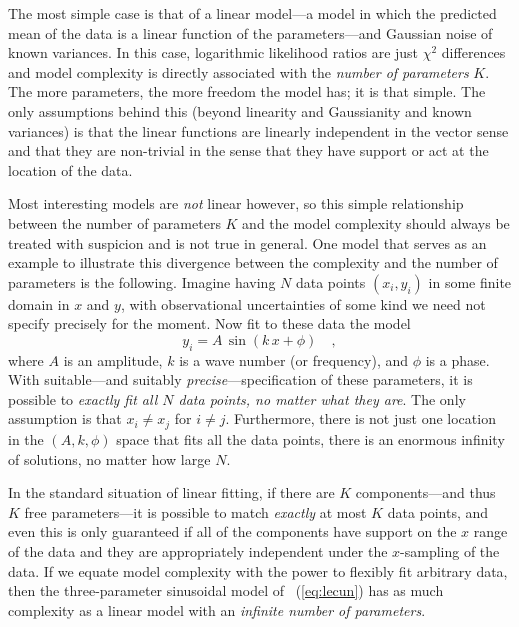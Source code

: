 \documentclass[12pt,twoside]{article}
\begin{document}
The most simple case is that of a linear model---a model in which the
predicted mean of the data is a linear function of the
parameters---and Gaussian noise of known variances.  In this case,
logarithmic likelihood ratios are just $\chi^2$ differences and model
complexity is directly associated with the \emph{number of parameters}
$K$.  The more parameters, the more freedom the model has; it is that
simple.  The only assumptions behind this (beyond linearity and
Gaussianity and known variances) is that the linear functions are
linearly independent in the vector sense and that they are non-trivial in the sense that they
have support or act at the location of the data.

Most interesting models are \emph{not} linear however, so this simple
relationship between the number of parameters $K$ and the model
complexity should always be treated with suspicion and is not true in
general.  One model that serves as an example to illustrate this
divergence between the complexity and the number of parameters is the
following.  Imagine having $N$ data points $(x_i,y_i)$ in some finite
domain in $x$ and $y$, with observational uncertainties of some kind
we need not specify precisely for the moment.  Now fit to these data
the model
\begin{equation}\label{eq:lecun}
y_i = A\,\sin (k\,x + \phi)
  \quad ,
\end{equation}
where $A$ is an amplitude, $k$ is a wave number (or frequency), and
$\phi$ is a phase.  With suitable---and suitably
\emph{precise}---specification of these parameters, it is possible to
\emph{exactly fit all $N$ data points, no matter what they are}.  The
only assumption is that $x_i \ne x_j$ for $i \ne j$.  Furthermore,
there is not just one location in the $(A,k,\phi)$ space that fits all
the data points, there is an enormous infinity of solutions, no matter
how large $N$.

In the standard situation of linear fitting, if there are $K$
components---and thus $K$ free parameters---it is possible to match
\emph{exactly} at most $K$ data points, and even this is only
guaranteed if all of the components have support on the $x$ range of
the data and they are appropriately independent under the $x$-sampling
of the data.  If we equate model complexity with the power to flexibly
fit arbitrary data, then the three-parameter sinusoidal model of
\equationname~(\ref{eq:lecun}) has as much complexity as a linear
model with an \emph{infinite number of parameters}.
\end{document}
